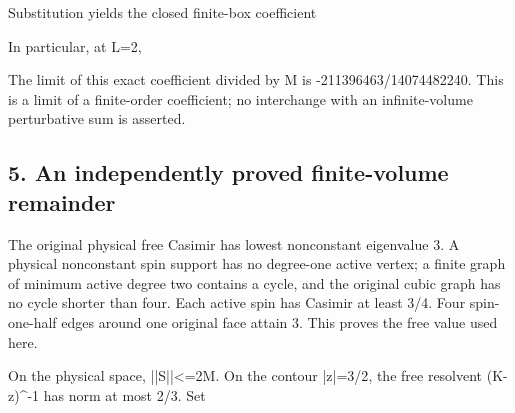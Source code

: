 \documentclass[11pt,a4paper]{article}
\renewcommand{\[}{\begingroup\small\originaldisplaystart}
\renewcommand{\]}{\originaldisplayend\endgroup}
\begin{document}
Substitution yields the closed finite-box coefficient

\[
\] In particular, at L=2,

\[
\] The limit of this exact coefficient divided by M is
{\ttfamily -\allowbreak{}2\allowbreak{}1\allowbreak{}1\allowbreak{}3\allowbreak{}9\allowbreak{}6\allowbreak{}4\allowbreak{}6\allowbreak{}3\allowbreak{}/\allowbreak{}1\allowbreak{}4\allowbreak{}0\allowbreak{}7\allowbreak{}4\allowbreak{}4\allowbreak{}8\allowbreak{}2\allowbreak{}2\allowbreak{}4\allowbreak{}0\allowbreak{}}.
This is a limit of a finite-order coefficient; no interchange with an
infinite-volume perturbative sum is asserted.

\subsection{5. An independently proved finite-volume
remainder}\label{an-independently-proved-finite-volume-remainder}

The original physical free Casimir has lowest nonconstant eigenvalue 3.
A physical nonconstant spin support has no degree-one active vertex; a
finite graph of minimum active degree two contains a cycle, and the
original cubic graph has no cycle shorter than four. Each active spin
has Casimir at least 3/4. Four spin-one-half edges around one original
face attain 3. This proves the free value used here.

On the physical space,
{\ttfamily |\allowbreak{}|\allowbreak{}S\allowbreak{}|\allowbreak{}|\allowbreak{}\textless{}\allowbreak{}=\allowbreak{}2\allowbreak{}M\allowbreak{}}.
On the contour
{\ttfamily |\allowbreak{}z\allowbreak{}|\allowbreak{}=\allowbreak{}3\allowbreak{}/\allowbreak{}2\allowbreak{}},
the free resolvent
{\ttfamily (\allowbreak{}K\allowbreak{}-\allowbreak{}z\allowbreak{})\allowbreak{}\textasciicircum{}\allowbreak{}-\allowbreak{}1\allowbreak{}}
has norm at most 2/3. Set
\end{document}
